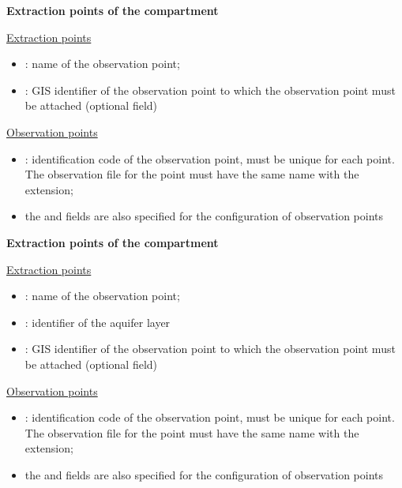 \begin{minipage}[t]{0.45\textwidth}
    \textbf{Extraction points of the  compartment}
    \vspace{4pt}

     \underline{Extraction points}

    \begin{itemize}
        \item {}: name of the observation point;
        \item {}: GIS identifier of the observation point to which the observation point must be attached (optional field)
    \end{itemize}

    \vspace{2pt}
    \underline{Observation points}
    \begin{itemize}
        \item {}: identification code of the observation point, must be unique for each point. The observation file for the point must have the same name with the  extension;
        \item the  and  fields are also specified for the configuration of observation points
    \end{itemize}
    \vspace{8pt}
    \textbf{Extraction points of the  compartment}
    \vspace{4pt}

     \underline{Extraction points}

    \begin{itemize}
        \item {}: name of the observation point;
        \item {}: identifier of the aquifer layer
        \item {}: GIS identifier of the observation point to which the observation point must be attached (optional field)
    \end{itemize}

    \vspace{2pt}
    \underline{Observation points}
    \begin{itemize}
        \item {}: identification code of the observation point, must be unique for each point. The observation file for the point must have the same name with the  extension;
        \item the  and  fields are also specified for the configuration of observation points
    \end{itemize}


\end{minipage}%
